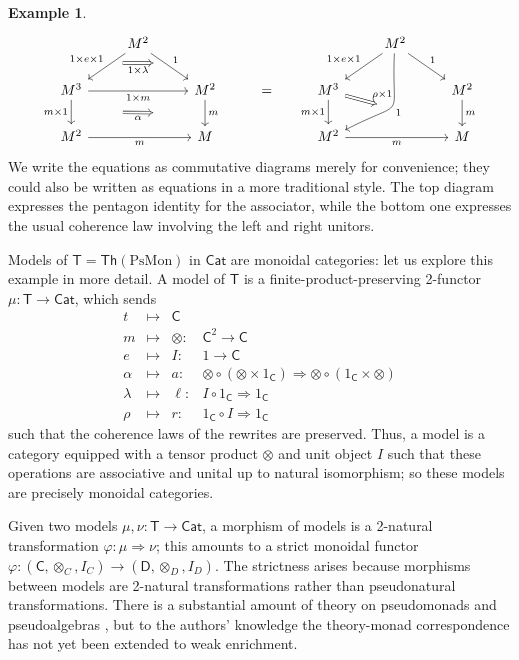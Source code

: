 \documentclass{amsart}
\theoremstyle{definition}
\newtheorem{example}[theorem]{Example}
\newcommand{\Th}{\mathsf{Th}}
\newcommand{\Cat}{\mathsf{Cat}}
\newcommand{\D}{\mathsf{D}}
\newcommand{\C}{\mathsf{C}}
\newcommand{\T}{\mathsf{T}}
\newcommand{\maps}{\colon}
\begin{document}
\begin{example}
      \[\begin{tikzcd}
          & M^2 \ar[dl,"1\times e\times 1",""name=a1,swap] \ar[dr,"1",""name=a2] \arrow[Rightarrow,from=a1,to=a2,"1\times \lambda",swap,shorten >=0.4cm,shorten <=0.4cm] & && & M^2 \ar[dl,"1\times e\times 1",swap] \ar[dr,"1"] \ar[ddl,bend left =30,looseness=2, "1",""name=c1] & \\
          M^3 \ar[d,"m\times 1",swap,""name=b1] \ar[rr,"1\times m",swap] && M^2 \ar[d,"m",""name=b2] \arrow[Rightarrow,from=b1,to=b2,"\alpha",shorten >=1.3cm,shorten <=1.3cm,swap] & = & M^3 \ar[d,"m\times 1",swap] \arrow[Rightarrow,to=c1,"\rho\times 1",shorten >=0.4cm,shorten <=0.0cm] && M^2 \ar[d,"m"] \\
          M^2 \ar[rr,"m",swap] && M && M^2 \ar[rr,"m",swap] && M
        \end{tikzcd}\]
\noindent We write the equations as commutative diagrams merely for convenience; they could also be written as equations in a more traditional style.   The top diagram expresses the pentagon identity for the associator, while the bottom one expresses the usual coherence law involving the left and right unitors.
   
Models of $\T = \Th(\mathrm{PsMon})$ in $\Cat$ are monoidal categories: let us explore this example in more detail.  A model of $\T$ is a finite-product-preserving 2-functor $\mu\colon \T\to \Cat$, which sends 
\[\begin{array}{rccl}
	t & \mapsto& \C & \\
	m & \mapsto & \otimes \maps &  \C^2 \to \C \\
	e & \mapsto & I \maps &  1\to \C \\
	\alpha & \mapsto & a \maps & \otimes \circ (\otimes \times 1_\C)  \Rightarrow  \otimes \circ (1_\C \times \otimes)\\
	\lambda & \mapsto & \ell \maps &  I\circ 1_\C  \Rightarrow  1_\C\\
	\rho & \mapsto & r \maps & 1_\C \circ I  \Rightarrow  1_\C
\end{array}\]
such that the coherence laws of the rewrites are preserved.  Thus, a model is a category equipped with a tensor product $\otimes$ and unit object $I$ such that these operations are associative and unital up to natural isomorphism; so these models are precisely monoidal categories.

Given two models $\mu,\nu\maps \T\to \Cat$, a morphism of models is a 2-natural transformation $\varphi\maps \mu \Rightarrow \nu$; this amounts to a strict monoidal functor $\varphi\maps (\C,\otimes_C,I_C)\to(\D,\otimes_D,I_D)$.  The strictness arises because morphisms between models are 2-natural transformations rather than pseudonatural transformations. There is a substantial amount of theory on pseudomonads and pseudoalgebras \cite{bkp,dubuc}, but to the authors' knowledge the theory-monad correspondence has not yet been extended to weak enrichment. 


\end{example}
\end{document}

